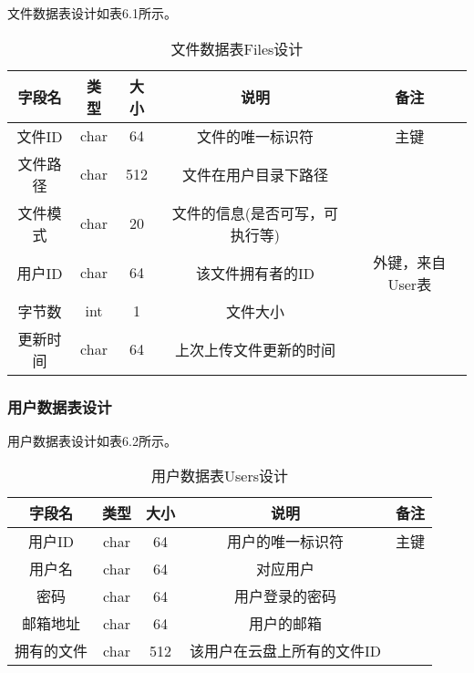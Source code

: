 文件数据表设计如表6.1所示。
\begin{table}[htbp]
\centering
\caption{文件数据表Files设计} \label{tab:file-database}
\begin{tabular}{|c|c|c|c|c|}
    \hline
    字段名 & 类型 & 大小 & 说明 & 备注 \\
    \hline
    文件ID & char & 64 & 文件的唯一标识符 & 主键\\
    \hline
    文件路径 & char & 512 & 文件在用户目录下路径 & \\
    \hline
    文件模式 & char & 20 & 文件的信息(是否可写，可执行等)& \\
    \hline
    用户ID & char & 64 & 该文件拥有者的ID & 外键，来自User表 \\
    \hline
    字节数 & int & 1 & 文件大小 & \\
    \hline
    更新时间 & char & 64 & 上次上传文件更新的时间 & \\
    \hline
\end{tabular}
\end{table}

\subsubsection{用户数据表设计}
用户数据表设计如表6.2所示。
\begin{table}[htbp]
\centering
\caption{用户数据表Users设计} \label{tab:user-database}
\begin{tabular}{|c|c|c|c|c|}
    \hline
    字段名 & 类型 & 大小 & 说明 & 备注 \\
    \hline
    用户ID & char & 64 & 用户的唯一标识符 & 主键\\
    \hline
    用户名 & char & 64 & 对应用户 & \\
    \hline
    密码 & char & 64 & 用户登录的密码 & \\
    \hline
    邮箱地址 & char & 64 & 用户的邮箱 & \\
    \hline
    拥有的文件 & char & 512 & 该用户在云盘上所有的文件ID & \\
    \hline
\end{tabular}
\end{table}

